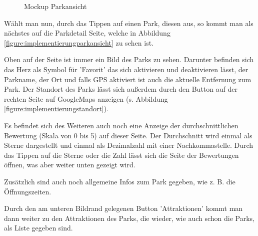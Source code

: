 \begin{figure}[h]
\begin{minipage}{0.49\textwidth}
        \caption{Mockup Parkansicht}
    \end{minipage}
\end{figure}

Wählt man nun, durch das Tippen auf einen Park, diesen aus, so kommt man als nächstes auf die Parkdetail Seite, welche in Abbildung \ref{figure:implementierungparkansicht} zu sehen ist. 

Oben auf der Seite ist immer ein Bild des Parks zu sehen. Darunter befinden sich das Herz als Symbol für 'Favorit' das sich aktivieren und deaktivieren lässt, der Parkname, der Ort und falls GPS aktiviert ist auch die aktuelle Entfernung zum Park. Der Standort des Parks lässt sich außerdem durch den Button auf der rechten Seite auf GoogleMaps anzeigen (s. Abbildung \ref{figure:implementierungstandort}). 

Es befindet sich des Weiteren auch noch eine Anzeige der durchschnittlichen Bewertung (Skala von 0 bis 5) auf dieser Seite. Der Durchschnitt wird einmal als Sterne dargestellt und einmal als Dezimalzahl mit einer Nachkommastelle. Durch das Tippen auf die Sterne oder die Zahl lässt sich die Seite der Bewertungen öffnen, was aber weiter unten gezeigt wird. 

Zusätzlich sind auch noch allgemeine Infos zum Park gegeben, wie z. B. die Öffnungszeiten. 

Durch den am unteren Bildrand gelegenen Button 'Attraktionen' kommt man dann weiter zu den Attraktionen des Parks, die wieder, wie auch schon die Parks, als Liste gegeben sind.

